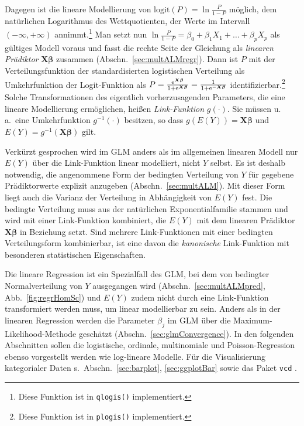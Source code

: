 Dagegen ist die lineare Modellierung von $\text{logit}(P) = \ln \frac{P}{1-P}$ möglich, dem natürlichen Logarithmus des Wettquotienten, der Werte im Intervall $(-{\infty}, +{\infty})$ annimmt.\footnote{Diese Funktion ist in \lstinline!qlogis()! implementiert.} Man setzt nun $\ln \frac{P}{1-P} = \beta_{0} + \beta_{1} X_{1} + \dots + \beta_{p} X_{p}$ als gültiges Modell voraus und fasst die rechte Seite der Gleichung als \emph{linearen Prädiktor} $\bm{X} \bm{\beta}$ zusammen (Abschn.\ \ref{sec:multALMregr}). Dann ist $P$ mit der Verteilungsfunktion der standardisierten logistischen Verteilung als Umkehrfunktion der Logit-Funktion als $P = \frac{{\mathrm{e}}^{\bm{X} \bm{\beta}}}{1+{\mathrm{e}}^{\bm{X} \bm{\beta}}} = \frac{1}{1+{\mathrm{e}}^{-\bm{X} \bm{\beta}}}$ identifizierbar.\footnote{Diese Funktion ist in \lstinline!plogis()! implementiert.} Solche Transformationen des eigentlich vorherzusagenden Parameters, die eine lineare Modellierung ermöglichen, heißen \emph{Link-Funktion} $g(\cdot)$. Sie müssen u.\,a.\ eine Umkehrfunktion $g^{-1}(\cdot)$ besitzen, so dass $g(E(Y)) = \bm{X} \bm{\beta}$ und $E(Y) = g^{-1}(\bm{X} \bm{\beta})$ gilt.

Verkürzt gesprochen wird im GLM anders als im allgemeinen linearen Modell nur $E(Y)$ über die Link-Funktion linear modelliert, nicht $Y$ selbst. Es ist deshalb notwendig, die angenommene Form der bedingten Verteilung von $Y$ für gegebene Prädiktorwerte explizit anzugeben (Abschn.\ \ref{sec:multALM}). Mit dieser Form liegt auch die Varianz der Verteilung in Abhängigkeit von $E(Y)$ fest. Die bedingte Verteilung muss aus der natürlichen Exponentialfamilie stammen und wird mit einer Link-Funktion kombiniert, die $E(Y)$ mit dem linearen Prädiktor $\bm{X} \bm{\beta}$ in Beziehung setzt. Sind mehrere Link-Funktionen mit einer bedingten Verteilungsform kombinierbar, ist eine davon die \emph{kanonische} Link-Funktion mit besonderen statistischen Eigenschaften.

Die lineare Regression ist ein Spezialfall des GLM, bei dem von bedingter Normalverteilung von $Y$ ausgegangen wird (Abschn.\ \ref{sec:multALMpred}, Abb.\ \ref{fig:regrHomSc}) und $E(Y)$ zudem nicht durch eine Link-Funktion transformiert werden muss, um linear modellierbar zu sein. Anders als in der linearen Regression werden die Parameter $\beta_{j}$ im GLM über die Maximum-Likelihood-Methode geschätzt (Abschn.\ \ref{sec:glmConvergence}). In den folgenden Abschnitten sollen die logistische, ordinale, multinomiale und Poisson-Regression ebenso vorgestellt werden wie log-lineare Modelle. Für die Visualisierung kategorialer Daten s.\ Abschn.\ \ref{sec:barplot}, \ref{sec:ggplotBar} sowie das Paket \lstinline!vcd! \cite{Meyer2009b}.

